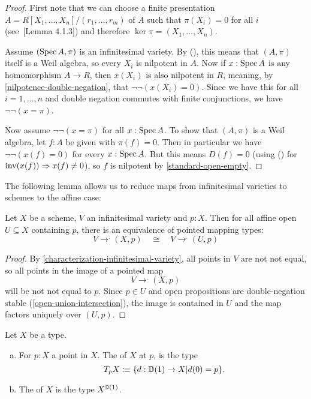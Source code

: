 \begin{proof}
  First note that we can choose a finite presentation
  $A = R[X_1, \dots, X_n]/(r_1, \dots, r_m)$
  of $A$
  such that $\pi(X_i) = 0$ for all $i$
  (see~\cite{david-orbifolds}[Lemma 4.1.3])
  and therefore $\ker \pi = (X_1, \dots, X_n)$.

  Assume $(\operatorname{Spec} A, \pi)$ is an infinitesimal variety.
  By (), this means that $(A, \pi)$ itself is a Weil algebra,
  so every $X_i$ is nilpotent in $A$.
  Now if $x : \operatorname{Spec} A$ is any homomorphism $A \to R$,
  then $x(X_i)$ is also nilpotent in $R$,
  meaning, by \cref{nilpotence-double-negation}, that $\lnot \lnot (x(X_i) = 0)$.
  Since we have this for all $i = 1, \dots, n$
  and double negation commutes with finite conjunctions,
  we have $\lnot \lnot (x = \pi)$.

  Now assume $\lnot \lnot (x = \pi)$ for all $x : \operatorname{Spec} A$.
  To show that $(A, \pi)$ is a Weil algebra,
  let $f : A$ be given with $\pi(f) = 0$.
  Then in particular we have $\lnot \lnot (x(f) = 0)$
  for every $x : \operatorname{Spec} A$.
  But this means $D(f) = 0$
  (using () for $\mathrm{inv}(x(f)) \Rightarrow x(f) \neq 0$),
  so $f$ is nilpotent by \cref{standard-open-empty}.
\end{proof}

The following lemma allows us to reduce
maps from infinitesimal varieties to schemes
to the affine case:

\begin{lemma}%
  \label{affine-opens-infinitesimal-closed}
  Let $X$ be a scheme, $V$ an infinitesimal variety and $p:X$.
  Then for all affine open $U\subseteq X$
  containing $p$, there is an equivalence
  of pointed mapping types:
  \[ V\to^. (X, p) \quad\cong\quad V\to^. (U, p) \]
\end{lemma}

\begin{proof}
  By \cref{characterization-infinitesimal-variety},
  all points in $V$ are not not equal,
  so all points in the image of a pointed map
  \[ V \to^. (X, p) \]
  will be not not equal to $p$.
  Since $p \in U$ and open propositions are double-negation stable
  (\cref{open-union-intersection}),
  the image is contained in $U$
  and the map factors uniquely over $(U, p)$.
\end{proof}

\begin{definition}
  Let $X$ be a type.
  \begin{enumerate}[(a)]
  \item For $p:X$ a point in $X$.
    The  of $X$ at $p$, is the type
    \[ T_pX\colonequiv \{d:\D(1)\to X\vert d(0)=p \}\rlap{.}\]
  \item The  of $X$ is the type $X^{\mathbb{D}(1)}$.
  \end{enumerate}
\end{definition}

